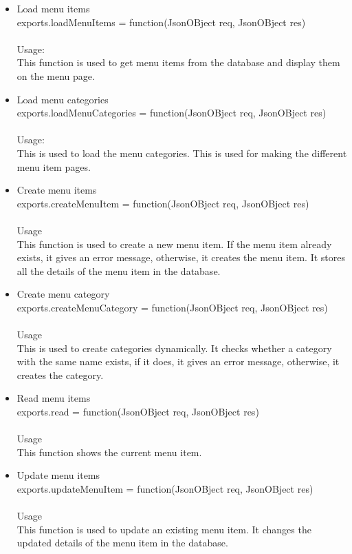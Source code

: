 \documentclass[a4paper,12pt]{article}
\begin{document}
\begin{enumerate}
\begin{itemize}
	\item Load menu items\\ exports.loadMenuItems = function(JsonOBject req, JsonOBject res) \\ \\
	Usage: \\
	This function is used to get menu items from the database and display them on the menu page.
	\item Load menu categories\\ exports.loadMenuCategories = function(JsonOBject req, JsonOBject res)\\  \\
	Usage: \\
	This is used to load the menu categories. This is used for making the different menu item pages. 
	\item Create menu items\\ exports.createMenuItem = function(JsonOBject req, JsonOBject res)\\ \\
 	 Usage\\ 
  	This function is used to create a new menu item. If the menu item already exists, it gives an error message, otherwise, it creates the menu item. It stores all the details of the menu item in the database.
	\item Create menu category\\ exports.createMenuCategory = function(JsonOBject req, JsonOBject res)\\ \\
 	 Usage\\ 
  	This is used to create categories dynamically. It checks whether a category with the same name exists, if it does, it gives an error message, otherwise, it creates the category.
	\item Read menu items\\ exports.read = function(JsonOBject req, JsonOBject res)\\ \\
 	 Usage\\ 
  	This function shows the current menu item.
	\item Update menu items\\ exports.updateMenuItem = function(JsonOBject req, JsonOBject res)\\ \\
 	 Usage\\ 
  	This function is used to update an existing menu item. It changes the updated details of the menu item in the database.

\end{itemize}
\end{enumerate}
\end{document}
